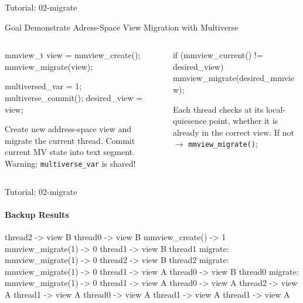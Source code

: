 \RequirePackage{luatex85}\documentclass[beamer,xcolor={table,rgb,dvipsnames}]{beamer}
\begin{document}
  \begin{frame}[fragile]{Tutorial: 02-migrate}
  \begin{btBlock}{Goal}
    Demonstrate Adress-Space View Migration with Multiverse
  \end{btBlock}

  \begin{columns}[t]
    \begin{column}{0.49\textwidth}
  \begin{code}[]
      \begin{C}
        mmview_t view = mmview_create();
        mmview_migrate(view);
        
        multiversed_var = 1;
        multiverse_commit();
        desired_view = view;
      \end{C}
    \end{code}

      \bi
      \ii Create new address-space view and migrate the current thread.
      \ii Commit current MV state into text segment.
      \ii Warning: \texttt{multiverse\_var} is shared!
      \ei
    \end{column}\hfill
    \begin{column}{0.49\textwidth}
  \begin{code}[]
      \begin{C}
        if (mmview_current() != desired_view) {
            mmview_migrate(desired_mmview);
        }
      \end{C}
    \end{code}
    
     Each thread checks at its local-\-quiesence point, whether it is already in the correct view. If not $\rightarrow$ \texttt{mmview\_migrate()};
    
    \end{column}
  \end{columns}
\end{frame}

\begin{frame}[fragile]{Tutorial: 02-migrate}
  \framesubtitle{Backup Results}

  \begin{code}[]
    \begin{codetext}
thread2  ->  view B 
thread0  ->  view B 
mmview_create() -> 1
mmview_migrate(1) -> 0
thread1  ->  view B 
thread1 migrate: mmview_migrate(1) -> 0
thread2  ->  view B 
thread2 migrate: mmview_migrate(1) -> 0
thread1  ->  view A 
thread0  ->  view B 
thread0 migrate: mmview_migrate(1) -> 0
thread1  ->  view A 
thread0  ->  view A 
thread2  ->  view A 
thread1  ->  view A 
thread0  ->  view A 
thread1  ->  view A 
thread1  ->  view A 
    \end{codetext}
  \end{code}
\end{frame}
\end{document}
